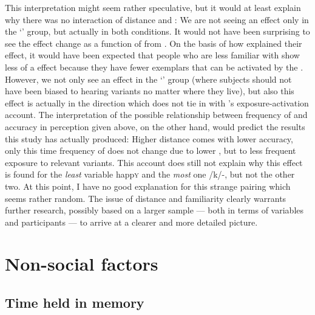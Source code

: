 This interpretation might seem rather speculative, but it would at least explain why there was no interaction of distance and : We are not seeing an effect only in the `' group, but actually in both conditions.
It would not have been surprising to see the  effect change as a function of  from .
On the basis of how \textcite{haydrager2010} explained their  effect, it would have been expected that people who are less familiar with  show less of a  effect because they have fewer exemplars that can be activated by the .
However, we not only see an effect in the `' group (where subjects should not have been biased to hearing  variants no matter where they live), but also this effect is actually in the direction which does not tie in with \citeauthor{haydrager2010}'s exposure-activation account.
The interpretation of the possible relationship between frequency of  and accuracy in perception given above, on the other hand, would predict the results this study has actually produced: Higher distance comes with lower accuracy, only this time frequency of  does not change due to lower , but to less frequent exposure to relevant variants.
This account does still not explain why this effect is found for the \emph{least}  variable happ\textsc{y} and the \emph{most}  one /k/-, but not the other two.
At this point, I have no good explanation for this strange pairing which seems rather random.
The issue of distance and familiarity clearly warrants further research, possibly based on a larger sample --- both in terms of variables and participants --- to arrive at a clearer and more detailed picture.

	\section{Non-social factors}
		\label{sec.perc_res.disc.nonsocial}

		\subsection{Time held in memory}

